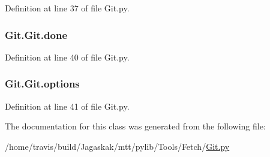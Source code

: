 Definition at line 37 of file Git.\-py.

\hypertarget{classGit_1_1Git_adb8991008d4bb4568fa9c2f991711cda}{
\subsubsection[{done}]{\setlength{\rightskip}{0pt plus 5cm}Git.\-Git.\-done}}\label{classGit_1_1Git_adb8991008d4bb4568fa9c2f991711cda}


Definition at line 40 of file Git.\-py.

\hypertarget{classGit_1_1Git_a7560b88b014c5da8785739c7bb6283ed}{
\subsubsection[{options}]{\setlength{\rightskip}{0pt plus 5cm}Git.\-Git.\-options}}\label{classGit_1_1Git_a7560b88b014c5da8785739c7bb6283ed}


Definition at line 41 of file Git.\-py.



The documentation for this class was generated from the following file\-:\begin{DoxyCompactItemize}
\item 
/home/travis/build/\-Jagaskak/mtt/pylib/\-Tools/\-Fetch/\hyperlink{Git_8py}{Git.\-py}\end{DoxyCompactItemize}
